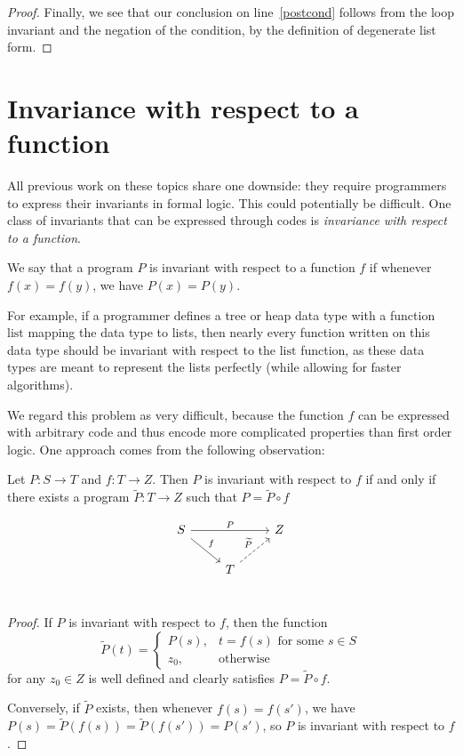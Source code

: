 \documentclass{llncs}
\begin{document}
\begin{proof}
    Finally, we see that our conclusion on line~\ref{postcond} follows from the
    loop invariant and the negation of the condition, by the definition of
    degenerate list form.

  \end{proof}

  \section{Invariance with respect to a function}

  All previous work on these topics share one downside: they require programmers
  to express their invariants in formal logic. This could potentially be
  difficult. One class of invariants that can be expressed through codes is
  \emph{invariance with respect to a function}.

  \begin{definition} We say that a program $P$ is invariant with respect to a
    function $f$ if whenever $f(x)=f(y)$, we have $P(x)=P(y)$.
  \end{definition}

  For example, if a programmer defines a tree or heap data type with a function
  $\mathrm{list}$ mapping the data type to lists,
  then nearly every function written on this data type should be invariant with
  respect to the $\mathrm{list}$ function,
  as these data types are meant to represent the lists perfectly (while allowing
  for faster algorithms).

  We regard this problem as very difficult, because the function $f$ can be
  expressed with arbitrary code and thus encode more complicated properties than
  first order logic. One approach comes from the following observation:

  \begin{lemma} Let $P : S \to T$ and $f : T \to Z$.
    Then $P$ is invariant with respect to $f$ if and only if
    there exists a program $\widetilde{P} : T\to Z$
    such that $P = \widetilde{P} \circ f$
  \end{lemma}
    \[
      \begin{tikzcd}
        S \arrow{rr}{P} \arrow{rd}{f} &   & Z \\
        & T \arrow[dashed]{ru}{\widetilde{P}} &   \\
      \end{tikzcd}
    \]
  \begin{proof}
    If $P$ is invariant with respect to $f$, then the function
    \[ \widetilde{P}(t) = \begin{cases}
         P(s), & t = f(s) \text{ for some $s\in S$} \\
         z_0, & \text{otherwise}
       \end{cases}
    \]
    for any $z_0 \in Z$
    is well defined and clearly satisfies $P = \widetilde{P} \circ f$.

    Conversely, if $\widetilde{P}$ exists, then whenever $f(s)=f(s')$,
    we have $P(s) = \widetilde{P}(f(s)) = \widetilde{P}(f(s')) = P(s')$,
    so $P$ is invariant with respect to $f$.
  \end{proof}
\end{document}
